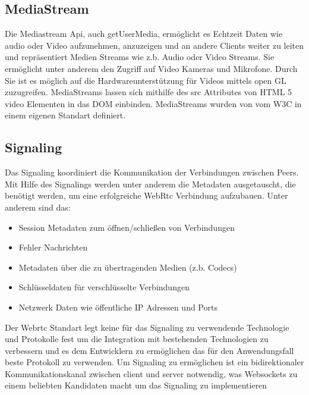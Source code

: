 \subsection{MediaStream}
Die Mediastream Api, auch getUserMedia, ermöglicht es Echtzeit Daten wie audio oder Video aufzunehmen, anzuzeigen und an andere Clients weiter zu leiten und repräsentiert Medien Streams wie z.b. Audio oder Video Streams. Sie ermöglicht unter anderem den Zugriff auf Video Kameras und Mikrofone. Durch Sie ist es möglich auf die Hardwareunterstützung für Videos mittels open GL zuzugreifen. MediaStreams lassen sich mithilfe des src Attributes von HTML 5 video Elementen in das DOM einbinden. MediaStreams wurden von vom W3C in einem eigenen Standart definiert.\cite{w3MediaStream} 

\subsection{Signaling}
Das Signaling koordiniert die Kommunikation der Verbindungen zwischen Peers. Mit Hilfe des Signalings werden unter anderem die Metadaten ausgetauscht, die benötigt werden, um eine erfolgreiche WebRtc Verbindung aufzubauen. Unter anderem sind das:
\begin{itemize}
	\item Session Metadaten zum öffnen/schließen von Verbindungen
	\item Fehler Nachrichten
	\item Metadaten über die zu übertragenden Medien (z.b. Codecs)
	\item Schlüsseldaten für verschlüsselte Verbindungen
	\item Netzwerk Daten wie öffentliche IP Adressen und Ports
\end{itemize} 

Der Webrtc Standart legt keine für das Signaling zu verwendende Technologie und Protokolle fest um die Integration mit bestehenden Technologien zu verbessern und es dem Entwicklern zu ermöglichen das für den Anwendungsfall beste Protokoll zu verwenden. Um Signaling zu ermöglichen ist ein bidirektionaler Kommunikationskanal zwischen client und server notwendig, was Websockets zu einem beliebten Kandidaten macht um das Signaling zu implementieren


